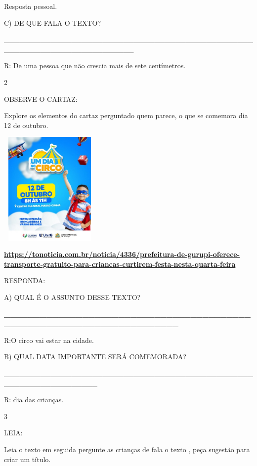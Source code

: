 {{{{{Resposta pessoal.

C) DE QUE FALA O TEXTO?

\_\_\_\_\_\_\_\_\_\_\_\_\_\_\_\_\_\_\_\_\_\_\_\_\_\_\_\_\_\_\_\_\_\_\_\_\_\_\_\_\_\_\_\_\_\_\_\_\_\_\_\_\_\_\_\_\_\_\_\_\_\_\_\_\_\_\_\_\_\_\_\_\_

R: De uma pessoa que não crescia mais de sete centímetros.

\num{2}

OBSERVE O CARTAZ:

Explore os elementos do cartaz perguntado quem parece, o que se comemora
dia 12 de outubro.

\includegraphics[width=1.92500in,height=2.18056in]{media/image119.jpeg}

\protect\hypertarget{_heading=h.t2raxp5v2ex8}{}{}

\href{https://tonoticia.com.br/noticia/4336/prefeitura-de-gurupi-oferece-transporte-gratuito-para-criancas-curtirem-festa-nesta-quarta-feira}{\textbf{https://tonoticia.com.br/noticia/4336/prefeitura-de-gurupi-oferece-transporte-gratuito-para-criancas-curtirem-festa-nesta-quarta-feira}}

RESPONDA:

A) QUAL É O ASSUNTO DESSE TEXTO?

\textbf{\_\_\_\_\_\_\_\_\_\_\_\_\_\_\_\_\_\_\_\_\_\_\_\_\_\_\_\_\_\_\_\_\_\_\_\_\_\_\_\_\_\_\_\_\_\_\_\_\_\_\_\_\_\_\_\_\_\_\_\_\_\_\_\_\_\_\_\_\_\_}

R:O circo vai estar na cidade.

B) QUAL DATA IMPORTANTE SERÁ COMEMORADA?

\_\_\_\_\_\_\_\_\_\_\_\_\_\_\_\_\_\_\_\_\_\_\_\_\_\_\_\_\_\_\_\_\_\_\_\_\_\_\_\_\_\_\_\_\_\_\_\_\_\_\_\_\_\_\_\_\_\_\_\_\_\_\_\_\_\_

R: dia das crianças.

\num{3}

LEIA:

Leia o texto em seguida pergunte as crianças de fala o texto , peça
sugestão para criar um título.

}}}}}
